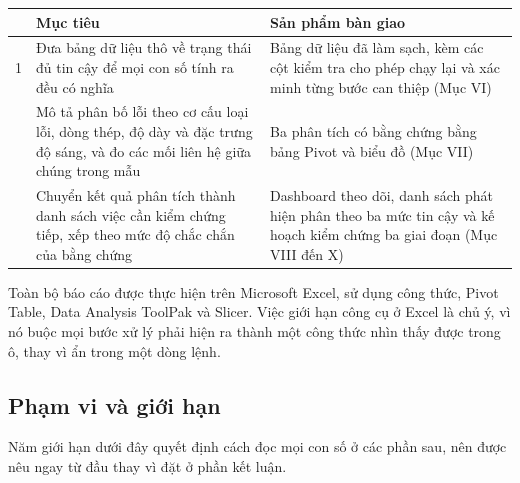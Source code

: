 \documentclass[12pt]{article}
\begin{document}
\begin{center}
\begin{tabular}{@{}p{0.5cm} p{6.6cm} p{8.6cm}@{}}
\toprule
 & \textbf{Mục tiêu} & \textbf{Sản phẩm bàn giao} \\
\midrule
1 & Đưa bảng dữ liệu thô về trạng thái đủ tin cậy để mọi con số tính ra đều có nghĩa & Bảng dữ liệu đã làm sạch, kèm các cột kiểm tra cho phép chạy lại và xác minh từng bước can thiệp (Mục VI) \\
\addlinespace[4pt]
2 & Mô tả phân bố lỗi theo cơ cấu loại lỗi, dòng thép, độ dày và đặc trưng độ sáng, và đo các mối liên hệ giữa chúng trong mẫu & Ba phân tích có bằng chứng bằng bảng Pivot và biểu đồ (Mục VII) \\
\addlinespace[4pt]
3 & Chuyển kết quả phân tích thành danh sách việc cần kiểm chứng tiếp, xếp theo mức độ chắc chắn của bằng chứng & Dashboard theo dõi, danh sách phát hiện phân theo ba mức tin cậy và kế hoạch kiểm chứng ba giai đoạn (Mục VIII đến X) \\
\bottomrule
\end{tabular}
\end{center}

\noindent Toàn bộ báo cáo được thực hiện trên Microsoft Excel, sử dụng công thức, Pivot Table, Data Analysis ToolPak và Slicer. Việc giới hạn công cụ ở Excel là chủ ý, vì nó buộc mọi bước xử lý phải hiện ra thành một công thức nhìn thấy được trong ô, thay vì ẩn trong một dòng lệnh.

\subsection{Phạm vi và giới hạn}

Năm giới hạn dưới đây quyết định cách đọc mọi con số ở các phần sau, nên được nêu ngay từ đầu thay vì đặt ở phần kết luận.
\end{document}
